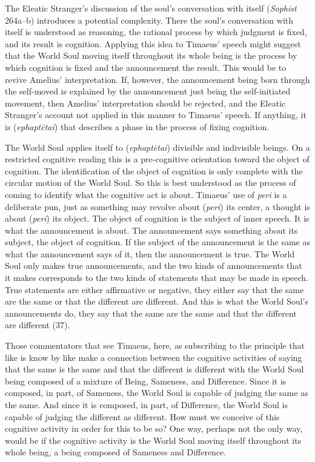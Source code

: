The Eleatic Stranger's discussion of the soul's conversation with itself (\emph{Sophist} 264a--b) introduces a potential complexity. There the soul's conversation with itself is understood as reasoning, the rational process by which judgment is fixed, and its result is cognition. Applying this idea to Timaeus' speech might suggest that the World Soul moving itself throughout its whole being is the process by which cognition is fixed and the announcement the result. This would be to revive Amelius' interpretation. If, however, the announcement being born through the self-moved is explained by the announcement just being the self-initiated movement, then Amelius' interpretation should be rejected, and the Eleatic Stranger's account not applied in this manner to Timaeus' speech. If anything, it is (\emph{ephaptētai}) that describes a phase in the process of fixing cognition.

The World Soul applies itself to (\emph{ephaptētai}) divisible and indivisible beings. On a restricted cognitive reading this is a pre-cognitive orientation toward the object of cognition. The identification of the object of cognition is only complete with the circular motion of the World Soul. So this is best understood as the process of coming to identify what the cognitive act is about. Timaeus' use of \emph{peri} is a deliberate pun, just as something may revolve about (\emph{peri}) its center, a thought is about (\emph{peri}) its object. The object of cognition is the subject of inner speech. It is what the announcement is about. The announcement says something about its subject, the object of cognition. If the subject of the announcement is the same as what the announcement says of it, then the announcement is true. The World Soul only makes true announcements, and the two kinds of announcements that it makes corresponds to the two kinds of statements that may be made in speech. True statements are either affirmative or negative, they either say that the same are the same or that the different are different. And this is what the World Soul's announcements do, they say that the same are the same and that the different are different (37).

Those commentators that see Timaeus, here, as subscribing to the principle that like is know by like make a connection between the cognitive activities of saying that the same is the same and that the different is different with the World Soul being composed of a mixture of Being, Sameness, and Difference. Since it is composed, in part, of Sameness, the World Soul is capable of judging the same as the same. And since it is composed, in part, of Difference, the World Soul is capable of judging the different as different. How must we conceive of this cognitive activity in order for this to be so? One way, perhaps not the only way, would be if the cognitive activity is the World Soul moving itself throughout its whole being, a being composed of Sameness and Difference.


